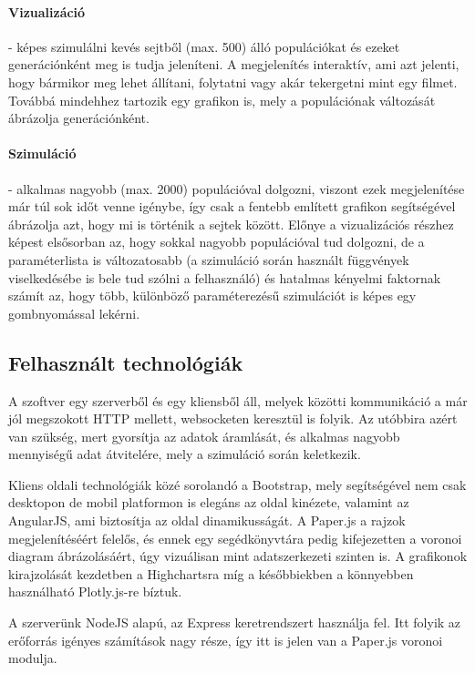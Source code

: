 \paragraph{Vizualizáció}- képes szimulálni kevés sejtből (max. 500) álló populációkat és ezeket generációnként meg is tudja jeleníteni. A megjelenítés interaktív, ami azt jelenti, hogy bármikor meg lehet állítani, folytatni vagy akár tekergetni mint egy filmet. Továbbá mindehhez tartozik egy grafikon is, mely a populációnak változását ábrázolja generációnként.

\paragraph{Szimuláció}- alkalmas nagyobb (max. 2000) populációval dolgozni, viszont ezek megjelenítése már túl sok időt venne igénybe, így csak a fentebb említett grafikon segítségével ábrázolja azt, hogy mi is történik a sejtek között. Előnye a vizualizációs részhez képest elsősorban az, hogy sokkal nagyobb populációval tud dolgozni, de a paraméterlista is változatosabb (a szimuláció során használt függvények viselkedésébe is bele tud szólni a felhasználó) és hatalmas kényelmi faktornak számít az, hogy több, különböző paraméterezésű szimulációt is képes egy gombnyomással lekérni.

\subsection{Felhasznált technológiák}

A szoftver egy szerverből és egy kliensből áll, melyek közötti kommunikáció a már jól megszokott HTTP mellett, websocketen keresztül is folyik. Az utóbbira azért van szükség, mert gyorsítja az adatok áramlását, és alkalmas nagyobb mennyiségű adat átvitelére, mely a szimuláció során keletkezik. 

Kliens oldali technológiák közé sorolandó a Bootstrap\cite{soft:bootstrap}, mely segítségével nem csak desktopon de mobil platformon is elegáns az oldal kinézete, valamint az AngularJS\cite{soft:angular}, ami biztosítja az oldal dinamikusságát. A Paper.js\cite{soft:paper} a rajzok megjelenítéséért felelős, és ennek egy segédkönyvtára\cite{soft:voronoiModule} pedig kifejezetten a voronoi diagram ábrázolásáért, úgy vizuálisan mint adatszerkezeti szinten is. A grafikonok kirajzolását kezdetben a Highchartsra\cite{soft:highcharts} míg a későbbiekben a könnyebben használható Plotly.js-re\cite{soft:plotly} bíztuk.

A szerverünk NodeJS\cite{soft:node} alapú, az Express\cite{soft:express} keretrendszert használja fel. Itt folyik az erőforrás igényes számítások nagy része, így itt is jelen van a Paper.js voronoi modulja\cite{soft:voronoiModule}.

